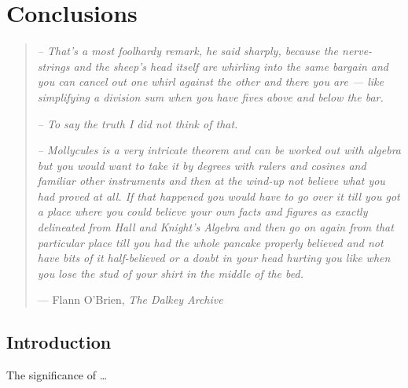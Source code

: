 %
%
%
%

\chapter{Conclusions}\label{C.conclusions}

\begin{quote}
\textit{-- That's a most foolhardy remark, he said sharply, because the nerve-strings and 
the sheep's head itself are whirling into the same bargain and you can cancel out one whirl 
against the other and there you are --- like simplifying a division sum when you have fives 
above and below the bar.}

\textit{-- To say the truth I did not think of that.} 

\textit{-- Mollycules is a very intricate theorem and can be worked out with algebra but you 
would want to take it by degrees with rulers and cosines and familiar other instruments and 
then at the wind-up not believe what you had proved at all.  If that happened you would have 
to go over it till you got a place where you could believe your own facts and figures as 
exactly delineated from Hall and Knight's Algebra and then go on again from that particular 
place till you had the whole pancake properly believed and not have bits of it half-believed 
or a doubt in your head hurting you like when you lose the stud of your shirt in the middle 
of the bed.} 

\hspace{2cm}--- Flann O'Brien, \emph{The Dalkey Archive}
\end{quote}


\section{Introduction}\label{S.Concl.intro}

The significance of \ldots

